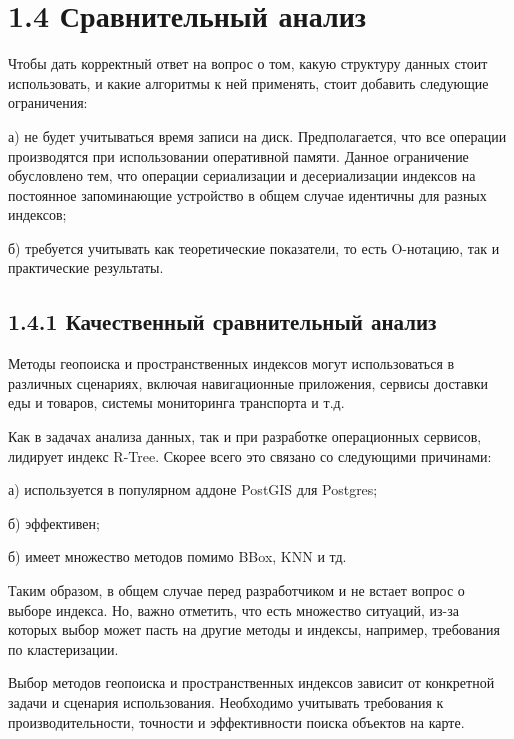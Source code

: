 \section{1.4 Сравнительный анализ}

Чтобы дать корректный ответ на вопрос о том, какую структуру данных стоит использовать, и какие алгоритмы к ней применять, стоит добавить следующие ограничения:
\par а) не будет учитываться время записи на диск. Предполагается, что все операции производятся при использовании оперативной памяти. Данное ограничение обусловлено тем, что операции сериализации и десериализации индексов на постоянное запоминающие устройство в общем случае идентичны для разных индексов;
\par б) требуется учитывать как теоретические показатели, то есть O-нотацию, так и практические результаты.


\subsection{1.4.1 Качественный сравнительный анализ}
Методы геопоиска и пространственных индексов могут использоваться в различных сценариях, включая навигационные приложения, сервисы доставки еды и товаров, системы мониторинга транспорта и т.д.\cite{heHBase}

Как в задачах анализа данных, так и при разработке операционных сервисов, лидирует индекс R-Tree. Скорее всего это связано со следующими причинами:
\par а) используется в популярном аддоне PostGIS для Postgres;
\par б) эффективен;
\par б) имеет множество методов помимо BBox, KNN и тд.

Таким образом, в общем случае перед разработчиком и не встает вопрос о выборе индекса. Но, важно отметить, что есть множество ситуаций, из-за которых выбор может пасть на другие методы и индексы, например, требования по кластеризации. 

Выбор методов геопоиска и пространственных индексов зависит от конкретной задачи и сценария использования. Необходимо учитывать требования к производительности, точности и эффективности поиска объектов на карте. 

